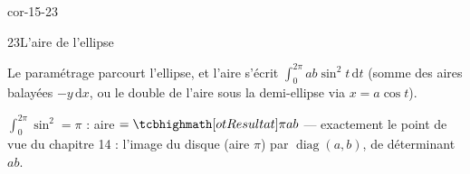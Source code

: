 \begin{blocLivre}{cor-15-23}
\begin{corrige}{23}{L'aire de l'ellipse}
\begin{questions}
  \item Le paramétrage parcourt l'ellipse, et l'aire s'écrit
    $\displaystyle\int_{0}^{2\pi}ab\sin^{2}t\,\mathrm{d}t$ (somme des
    aires balayées $-y\,\mathrm{d}x$, ou le double de l'aire sous la
    demi-ellipse via $x=a\cos t$).
  \item $\displaystyle\int_{0}^{2\pi}\sin^{2}=\pi$ :
    aire $=\res{\pi ab}$ — exactement le point de vue du chapitre 14 :
    l'image du disque (aire $\pi$) par $\operatorname{diag}(a,b)$, de
    déterminant $ab$.
\end{questions}
\end{corrige}
\end{blocLivre}

